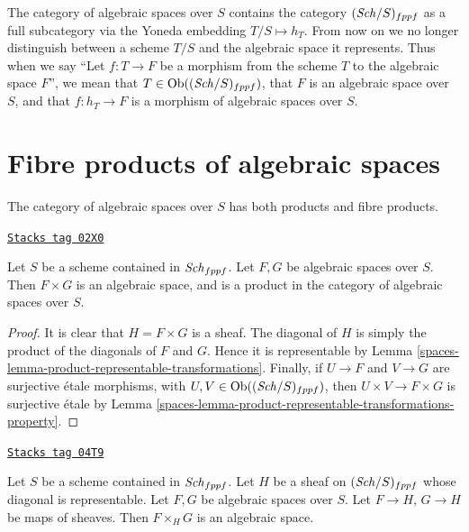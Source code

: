 The category of algebraic spaces over $S$ contains the category
$(\mathit{Sch}/S)_{fppf}$ as a full subcategory via the
Yoneda embedding $T/S \mapsto h_T$. From now on we no longer distinguish
between a scheme $T/S$ and the algebraic space it represents.
Thus when we say ``Let $f : T \to F$ be a morphism from the scheme
$T$ to the algebraic space $F$'', we mean that
$T \in \operatorname{Ob}((\mathit{Sch}/S)_{fppf})$, that $F$ is an
algebraic space over $S$, and that $f : h_T \to F$ is a morphism
of algebraic spaces over $S$.

\section{Fibre products of algebraic spaces}
\label{spaces-section-fibre-products}
The category of algebraic spaces over $S$ has both products and
fibre products.

\begin{lemma}
\label{spaces-lemma-product-spaces}
\href{https://stacks.math.columbia.edu/tag/02X0}{\texttt{Stacks tag 02X0}}

Let $S$ be a scheme contained in $\mathit{Sch}_{fppf}$.
Let $F, G$ be algebraic spaces over $S$.
Then $F \times G$ is an algebraic space, and is a product
in the category of algebraic spaces over $S$.
\end{lemma}

\begin{proof}

It is clear that $H = F \times G$ is a sheaf.
The diagonal of $H$ is simply the product of the
diagonals of $F$ and $G$. Hence it is representable by
Lemma \ref{spaces-lemma-product-representable-transformations}.
Finally, if $U \to F$ and $V \to G$ are surjective
\'etale morphisms, with $U, V \in \operatorname{Ob}((\mathit{Sch}/S)_{fppf})$,
then $U \times V \to F \times G$ is surjective \'etale
by Lemma \ref{spaces-lemma-product-representable-transformations-property}.
\end{proof}

\begin{lemma}
\label{spaces-lemma-fibre-product-spaces-over-sheaf-with-representable-diagonal}
\href{https://stacks.math.columbia.edu/tag/04T9}{\texttt{Stacks tag 04T9}}

Let $S$ be a scheme contained in $\mathit{Sch}_{fppf}$.
Let $H$ be a sheaf on $(\mathit{Sch}/S)_{fppf}$ whose diagonal
is representable. Let $F, G$ be algebraic spaces over $S$.
Let $F \to H$, $G \to H$ be maps of sheaves.
Then $F \times_H G$ is an algebraic space.
\end{lemma}

